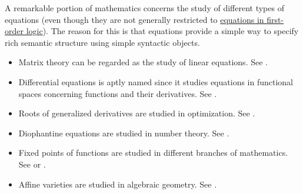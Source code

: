 \begin{example}\label{ex:equations}
  A remarkable portion of mathematics concerns the study of different types of equations (even though they are not generally restricted to \hyperref[def:first_order_equation]{equations in first-order logic}). The reason for this is that equations provide a simple way to specify rich semantic structure using simple syntactic objects.

  \begin{itemize}
    \item Matrix theory can be regarded as the study of linear equations. See .
    \item Differential equations is aptly named since it studies equations in functional spaces concerning functions and their derivatives. See .
    \item Roots of generalized derivatives are studied in optimization. See .
    \item Diophantine equations are studied in number theory. See .
    \item Fixed points of functions are studied in different branches of mathematics. See  or .
    \item Affine varieties are studied in algebraic geometry. See .
  \end{itemize}
\end{example}

